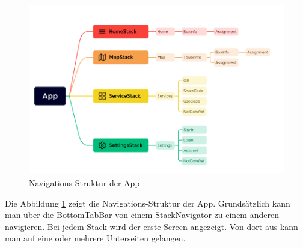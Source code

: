 \begin{figure}[H]
    \centering
    \includegraphics[width=1\textwidth]{images/appnavigation.png}
    \caption{Navigations-Struktur der App}
    \label{fig:appnavigation}
\end{figure}

\noindent Die Abbildung \ref{fig:appnavigation} zeigt die Navigations-Struktur der App. Grundsätzlich kann man über die \Gls{BottomTabBar} von einem \Gls{StackNavigator} zu einem anderen navigieren. Bei jedem Stack wird der erste Screen angezeigt. Von dort aus kann man auf eine oder mehrere Unterseiten gelangen.
\clearpage